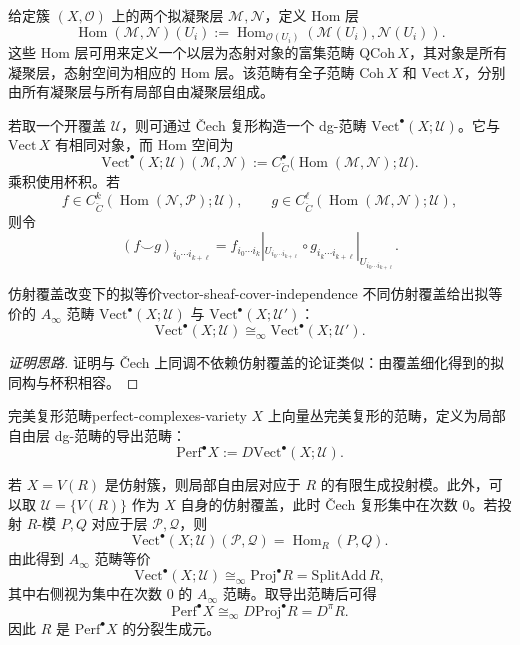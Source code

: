 给定簇 $(X,\mathcal O)$ 上的两个拟凝聚层 $\mathcal M,\mathcal N$，定义 Hom 层
\[
  \operatorname{Hom}(\mathcal M,\mathcal N)(U_i)
  :=\operatorname{Hom}_{\mathcal O(U_i)}(\mathcal M(U_i),\mathcal N(U_i)).
\]
这些 Hom 层可用来定义一个以层为态射对象的富集范畴 $\mathrm{QCoh}\,X$，其对象是所有凝聚层，态射空间为相应的 Hom 层。该范畴有全子范畴 $\mathrm{Coh}\,X$ 和 $\mathrm{Vect}\,X$，分别由所有凝聚层与所有局部自由凝聚层组成。

若取一个开覆盖 $\mathcal U$，则可通过 Čech 复形构造一个 dg-范畴 $\mathrm{Vect}^{\bullet}(X;\mathcal U)$。它与 $\mathrm{Vect}\,X$ 有相同对象，而 Hom 空间为
\[
  \mathrm{Vect}^{\bullet}(X;\mathcal U)(\mathcal M,\mathcal N)
  :=C^\bullet_{\check C}\bigl(\operatorname{Hom}(\mathcal M,\mathcal N);\mathcal U\bigr).
\]
乘积使用杯积。若
\[
  f\in C^k_{\check C}(\operatorname{Hom}(\mathcal N,\mathcal P);\mathcal U),\qquad
  g\in C^\ell_{\check C}(\operatorname{Hom}(\mathcal M,\mathcal N);\mathcal U),
\]
则令
\[
  (f\smile g)_{i_0\cdots i_{k+\ell}}
  =f_{i_0\cdots i_k}|_{U_{i_0\cdots i_{k+\ell}}}
   \circ g_{i_k\cdots i_{k+\ell}}|_{U_{i_0\cdots i_{k+\ell}}}.
\]

\begin{lemma}{仿射覆盖改变下的拟等价}{vector-sheaf-cover-independence}
不同仿射覆盖给出拟等价的 $A_\infty$ 范畴 $\mathrm{Vect}^{\bullet}(X;\mathcal U)$ 与 $\mathrm{Vect}^{\bullet}(X;\mathcal U')$：
\[
  \mathrm{Vect}^{\bullet}(X;\mathcal U)\cong_\infty
  \mathrm{Vect}^{\bullet}(X;\mathcal U').
\]
\end{lemma}
\begin{proof}[证明思路]
证明与 Čech 上同调不依赖仿射覆盖的论证类似：由覆盖细化得到的拟同构与杯积相容。
\end{proof}

\begin{definition}{完美复形范畴}{perfect-complexes-variety}
$X$ 上向量丛完美复形的范畴，定义为局部自由层 dg-范畴的导出范畴：
\[
  \mathrm{Perf}^{\bullet}X:=D\mathrm{Vect}^{\bullet}(X;\mathcal U).
\]
\end{definition}

\begin{example}[仿射簇上的完美复形]
若 $X=V(R)$ 是仿射簇，则局部自由层对应于 $R$ 的有限生成投射模。此外，可以取 $\mathcal U=\{V(R)\}$ 作为 $X$ 自身的仿射覆盖，此时 Čech 复形集中在次数 $0$。若投射 $R$-模 $P,Q$ 对应于层 $\mathcal P,\mathcal Q$，则
\[
  \mathrm{Vect}^{\bullet}(X;\mathcal U)(\mathcal P,\mathcal Q)
  =\operatorname{Hom}_R(P,Q).
\]
由此得到 $A_\infty$ 范畴等价
\[
  \mathrm{Vect}^{\bullet}(X;\mathcal U)\cong_\infty
  \mathrm{Proj}^{\bullet}R=\mathrm{SplitAdd}\,R,
\]
其中右侧视为集中在次数 $0$ 的 $A_\infty$ 范畴。取导出范畴后可得
\[
  \mathrm{Perf}^{\bullet}X\cong_\infty D\mathrm{Proj}^{\bullet}R=D^\pi R.
\]
因此 $R$ 是 $\mathrm{Perf}^{\bullet}X$ 的分裂生成元。
\end{example}

